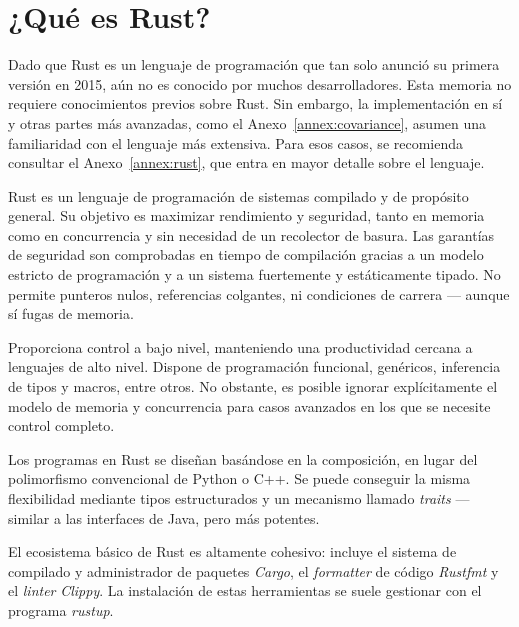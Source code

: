 
\chapter{¿Qué es Rust?}\label{ch:rust}

Dado que Rust es un lenguaje de programación que tan solo anunció su primera
versión en 2015, aún no es conocido por muchos desarrolladores. Esta memoria no
requiere conocimientos previos sobre Rust. Sin embargo, la implementación en sí
y otras partes más avanzadas, como el Anexo~\ref{annex:covariance}, asumen una
familiaridad con el lenguaje más extensiva. Para esos casos, se recomienda
consultar el Anexo~\ref{annex:rust}, que entra en mayor detalle sobre el
lenguaje.

Rust es un lenguaje de programación de sistemas compilado y de propósito
general. Su objetivo es maximizar rendimiento y seguridad, tanto en memoria como
en concurrencia y sin necesidad de un recolector de basura. Las garantías de
seguridad son comprobadas en tiempo de compilación gracias a un modelo estricto
de programación y a un sistema fuertemente y estáticamente tipado. No permite
punteros nulos, referencias colgantes, ni condiciones de carrera --- aunque sí
fugas de memoria.

Proporciona control a bajo nivel, manteniendo una productividad cercana a
lenguajes de alto nivel. Dispone de programación funcional, genéricos,
inferencia de tipos y macros, entre otros. No obstante, es posible ignorar
explícitamente el modelo de memoria y concurrencia para casos avanzados en los
que se necesite control completo.

Los programas en Rust se diseñan basándose en la composición, en lugar del
polimorfismo convencional de Python o C++. Se puede conseguir la misma
flexibilidad mediante tipos estructurados y un mecanismo llamado \emph{traits}
--- similar a las interfaces de Java, pero más potentes.

El ecosistema básico de Rust es altamente cohesivo: incluye el sistema de
compilado y administrador de paquetes \emph{Cargo}, el \emph{formatter} de
código \emph{Rustfmt} y el \emph{linter} \emph{Clippy}. La instalación de estas
herramientas se suele gestionar con el programa \emph{rustup}.
